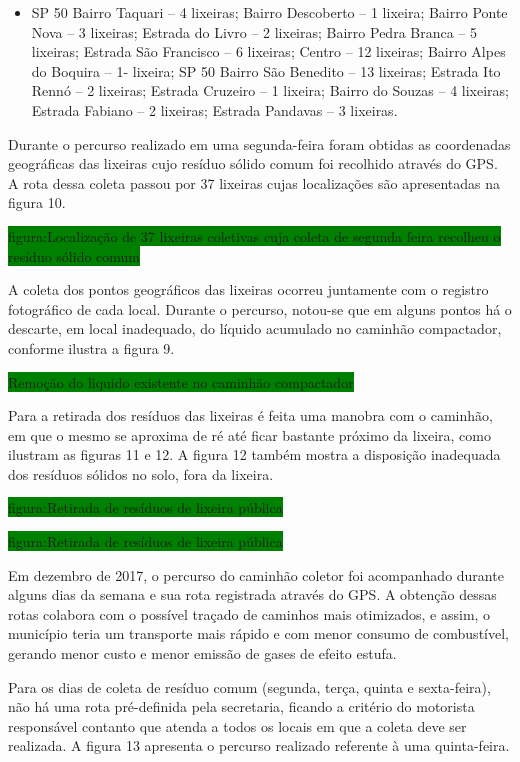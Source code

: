 	\begin{itemize}
		\item SP 50 Bairro Taquari – 4 lixeiras; 
		Bairro Descoberto – 1 lixeira; 
		Bairro Ponte Nova – 3 lixeiras; 
		Estrada do Livro – 2 lixeiras; 
		Bairro Pedra Branca – 5 lixeiras; 
		Estrada São Francisco – 6 lixeiras; 
		Centro – 12 lixeiras; 
		Bairro Alpes do Boquira – 1- lixeira; 
		SP 50 Bairro São Benedito – 13 lixeiras; 
		Estrada Ito Rennó – 2 lixeiras; 
		Estrada Cruzeiro – 1 lixeira; 
		Bairro do Souzas – 4 lixeiras; 
		Estrada Fabiano – 2 lixeiras; 
		Estrada Pandavas – 3 lixeiras.
	\end{itemize}

	Durante o percurso realizado em uma segunda-feira foram obtidas as coordenadas geográficas das lixeiras cujo resíduo sólido comum foi recolhido através do GPS. A rota dessa coleta passou por 37 lixeiras cujas localizações são apresentadas na figura 10. 
	
	\colorbox{green}{figura:Localização de 37 lixeiras coletivas cuja coleta de segunda feira recolheu o resíduo sólido comum}
	
	A coleta dos pontos geográficos das lixeiras ocorreu juntamente com o registro fotográfico de cada local.  Durante o percurso, notou-se que em alguns pontos há o descarte, em local inadequado, do líquido acumulado no caminhão compactador, conforme ilustra a figura 9.
	
	\colorbox{green}{Remoção do liquido existente no caminhão compactador}
	
	Para a retirada dos resíduos das lixeiras é feita uma manobra com o caminhão, em que o mesmo se aproxima de ré até ficar bastante próximo da lixeira, como ilustram as figuras 11 e 12. A figura 12 também mostra a disposição inadequada dos resíduos sólidos no solo, fora da lixeira.
	
	\colorbox{green}{figura:Retirada de resíduos de lixeira pública}
	
	\colorbox{green}{figura:Retirada de resíduos de lixeira pública}
	
	Em dezembro de 2017, o percurso do caminhão coletor foi acompanhado durante alguns dias da semana e sua rota registrada através do GPS. A obtenção dessas rotas colabora com o possível traçado de caminhos mais otimizados, e assim, o município teria um transporte mais rápido e com menor consumo de combustível, gerando menor custo e menor emissão de gases de efeito estufa.
	
	Para os dias de coleta de resíduo comum (segunda, terça, quinta e sexta-feira), não há uma rota pré-definida pela secretaria, ficando a critério do motorista responsável contanto que atenda a todos os locais em que a coleta deve ser realizada. A figura 13 apresenta o percurso realizado referente à uma quinta-feira.
	

